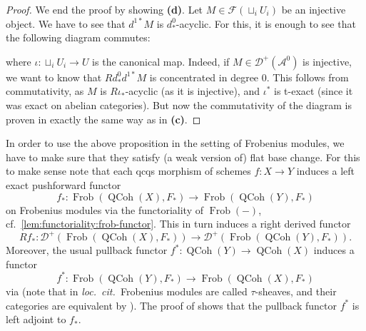 \documentclass{article}
\theoremstyle{definition}
\theoremstyle{definition}
\theoremstyle{definition}
\theoremstyle{plain}
\theoremstyle{plain}
\theoremstyle{plain}
\theoremstyle{plain}
\theoremstyle{plain}
\theoremstyle{plain}
\theoremstyle{plain}
\theoremstyle{plain}
\theoremstyle{remark}
\theoremstyle{remark}
\theoremstyle{plain}
\theoremstyle{plain}
\theoremstyle{plain}
\theoremstyle{plain}
\theoremstyle{plain}
\newcommand{\QCoh}[1]{\operatorname{QCoh}(#1)}
\newcommand{\Frob}[2]{\operatorname{Frob}(#1, #2)}
\newcommand{\FrobSingle}[1]{\operatorname{Frob}(#1)}
\newcommand{\Cat}[1]{\mathcal{#1}}
\newcommand{\loccit}{\textit{loc.~cit.~}}
\begin{document}
\begin{proof}
    We end the proof by showing \textbf{(d)}.
    Let $M \in \Cat F(\sqcup_i U_i)$ be an injective object.
    We have to see that $d^{1*} M$ is $d^0_*$-acyclic.
    For this, it is enough to see that the following diagram commutes:
    \begin{center}
    \end{center}
    where $\iota \colon \sqcup_i U_i \to U$ is the canonical map.
    Indeed, if $M \in \Cat D^+ (\Cat A^0)$ is injective,
    we want to know that $Rd_*^0 d^{1*} M$ is concentrated in degree $0$.
    This follows from commutativity, as $M$ is $R\iota_*$-acyclic (as it is injective),
    and $\iota^*$ is t-exact (since it was exact on abelian categories).
    But now the commutativity of the diagram is proven in exactly the same way as in \textbf{(c)}.
\end{proof}

In order to use the above proposition in the setting of Frobenius modules, we have to make sure 
that they satisfy (a weak version of) flat base change. 
For this to make sense note that each qcqs morphism of schemes $f\colon X \to Y$ induces a left exact pushforward functor
\begin{equation*}
    f_* \colon \Frob{\QCoh{X}}{F_*} \to \Frob{\QCoh{Y}}{F_*}
\end{equation*}
on Frobenius modules via the functoriality of $\FrobSingle{-}$, cf.\ \cref{lem:functoriality:frob-functor}.
This in turn induces a right derived functor
\begin{equation*}
    Rf_* \colon \Cat D^+(\Frob{\QCoh{X}}{F_*}) \to \Cat D^+(\Frob{\QCoh{Y}}{F_*}).
\end{equation*} 
Moreover, the usual pullback functor $f^* \colon \QCoh{Y} \to \QCoh{X}$ induces a functor
\begin{equation*}
    f^* \colon \Frob{\QCoh{Y}}{F_*} \to \Frob{\QCoh{X}}{F_*}
\end{equation*}
via \cite[Definition 4.1.1]{bockle2014cohomological} (note that in \loccit Frobenius modules are called $\tau$-sheaves, and their categories are equivalent by \cite[Corollary 2.10]{cartmod}).
The proof of \cite[Proposition 4.4.5]{bockle2014cohomological} shows that the pullback functor $f^*$ is left adjoint to $f_*$.
\end{document}
